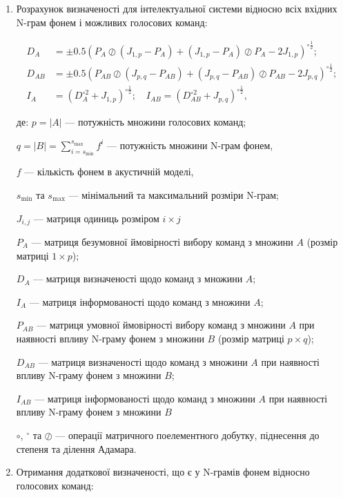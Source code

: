 \begin{enumerate}
	\item Розрахунок визначеності для інтелектуальної системи відносно всіх вхідних N-грам фонем і можливих голосових команд:
	
	\begin{align}
		D_A&=\pm0.5(P_{A}\oslash(J_{1,p}-P_{A}) + (J_{1,p}-P_{A})\oslash P_{A} -2J_{1,p})^{\circ \frac{1}{2}}; \nonumber \\
		D_{AB}&=\pm0.5(P_{AB}\oslash(J_{p,q}-P_{AB}) + (J_{p,q}-P_{AB})\oslash P_{AB}-2J_{p,q})^{\circ \frac{1}{2}}; \nonumber \\
		I_A&=(D_A^{\circ 2}+J_{1,p})^{\circ \frac{1}{2}};\quad I_{AB}=(D_{AB}^{\circ 2}+J_{p,q})^{\circ \frac{1}{2}}, \nonumber
	\end{align}
	
	де: $p=|A|$ --- потужність множини голосових команд;
	
	{\settowidth{\leftskip}{де:\ }
	
		$q=|B|=\sum_{i=s_{\text{min}}}^{s_{\text{max}}}f^i$ --- потужність множини N-грам фонем,
		
		$f$ --- кількість фонем в акустичній моделі,
		
		$s_{\text{min}}$ та $s_{\text{max}}$ --- мінімальний та максимальний розміри N-грам;
		
		$J_{i,j}$ --- матриця одиниць розміром $i\times j$
		
		$P_{A}$ --- матриця безумовної ймовірності вибору команд з множини $A$ (розмір матриці $1\times p$); 
		
		$D_A$ --- матриця визначеності щодо команд з множини $A$; 
		
		$I_A$ --- матриця інформованості щодо команд з множини $A$; 
		
		$P_{AB}$ --- матриця умовної ймовірності вибору команд з множини $A$ при наявності впливу N-граму фонем з множини $B$ (розмір матриці $p\times q$); 
		
		$D_{AB}$ --- матриця визначеності щодо команд з множини $A$ при наявності впливу N-граму фонем з множини $B$; 
		
		$I_{AB}$ --- матриця інформованості щодо команд з множини $A$ при наявності впливу N-граму фонем з множини $B$
		
		$\circ$, ${}^{\circ}$ та $\oslash$ --- операції матричного поелементного добутку, піднесення до степеня та ділення Адамара.
		
	}
	
	\item Отримання додаткової визначеності, що є у N-грамів фонем відносно голосових команд:
	

\end{enumerate}
